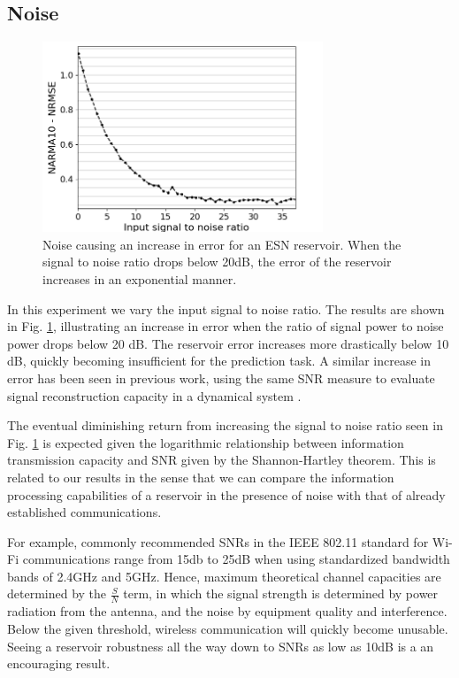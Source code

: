 \subsection{Noise}

\begin{figure}[t!]
  \centering
  \includegraphics[width=3.3in]{img/input_noise_snr.png}
  \caption{
    Noise causing an increase in error for an ESN reservoir. When the signal to
noise ratio drops below 20dB, the error of the reservoir increases in an
exponential manner.
  }
  \label{input_noise_snr}
\end{figure}

In this experiment we vary the input signal to noise ratio. The results are
shown in Fig. \ref{input_noise_snr}, illustrating an increase in error when the
ratio of signal power to noise power drops below 20 dB. The reservoir error
increases more drastically below 10 dB, quickly becoming insufficient for the
prediction task. A similar increase in error has been seen in previous work,
using the same SNR measure to evaluate signal reconstruction capacity in a
dynamical system \cite{dambre_information_2012}.

The eventual diminishing return from increasing the signal to noise ratio seen
in Fig. \ref{input_noise_snr} is expected given the logarithmic relationship
between information transmission capacity and SNR given by the Shannon-Hartley
theorem. This is related to our results in the sense that we can compare the
information processing capabilities of a reservoir in the presence of noise with
that of already established communications.

For example, commonly recommended SNRs in the IEEE 802.11 standard for Wi-Fi
communications range from 15db to 25dB when using standardized bandwidth bands
of 2.4GHz and 5GHz. Hence, maximum theoretical channel capacities are determined
by the $\frac{S}{N}$ term, in which the signal strength is determined by power
radiation from the antenna, and the noise by equipment quality and
interference. Below the given threshold, wireless communication will quickly
become unusable. Seeing a reservoir robustness all the way down to SNRs as low
as 10dB is a an encouraging result.

